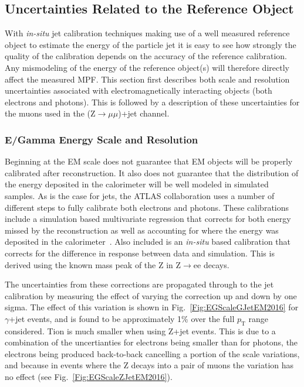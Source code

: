 \subsection{Uncertainties Related to the Reference Object}
With \textit{in-situ} jet calibration techniques making use of a well measured reference object to estimate the energy of the particle jet it is easy to see how strongly the quality of the calibration depends on the accuracy of the reference calibration.  
Any mismodeling of the energy of the reference object(s) will therefore directly affect the measured MPF.  
This section first describes both scale and resolution uncertainties associated with electromagnetically interacting objects (both electrons and photons).  
This is followed by a description of these uncertainties for the muons used in the (Z$\rightarrow\mu\mu$)+jet channel.  
\subsubsection{E/Gamma Energy Scale and Resolution}

Beginning at the EM scale does not guarantee that EM objects will be properly calibrated after reconstruction.  
It also does not guarantee that the distribution of the energy deposited in the calorimeter will be well modeled in simulated samples.  
As is the case for jets, the ATLAS collaboration uses a number of different steps to fully calibrate both electrons and photons.  
These calibrations include a simulation based multivariate regression that corrects for both energy missed by the reconstruction as well as accounting for where the energy was deposited in the calorimeter~\cite{ATL-PHYS-PUB-2016-015}.  
Also included is an \textit{in-situ} based calibration that corrects for the difference in response between data and simulation.  
This is derived using the known mass peak of the Z in Z$\rightarrow$ee decays.  

The uncertainties from these corrections are propagated through to the jet calibration by measuring the effect of varying the correction up and down by one sigma.  
The effect of this variation is shown in Fig.~\ref{Fig:EGScaleGJetEM2016} for $\gamma$+jet events, and is found to be approximately 1\% over the full $p_{\mathrm T}$ range considered.  
Tion is much smaller when using Z+jet events.  
This is due to a combination of the uncertianties for electrons being smaller than for photons, the electrons being produced back-to-back cancelling a portion of the scale variations, and because in events where the Z decays into a pair of muons the variation has no effect (see Fig.~\ref{Fig:EGScaleZJetEM2016}).

